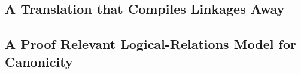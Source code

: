 \subsection{A Translation that Compiles Linkages Away}





% 


\subsection{A Proof Relevant Logical-Relations Model for Canonicity}
\label{sec:canonicity-model}



